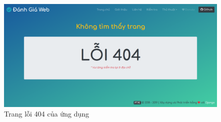 \begin{center}
    \begin{figure}[!ht]
        \centering
        \includegraphics[width=120mm]{images/trang-loi-404.png}
        \caption{Trang lỗi 404 của ứng dụng}
    \end{figure}
\end{center}